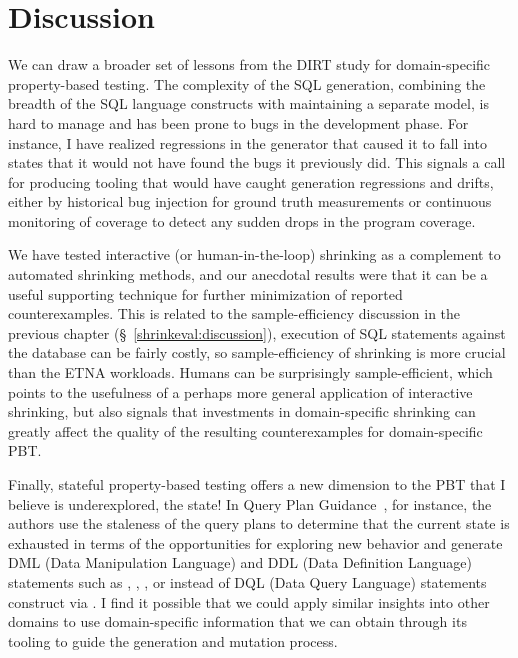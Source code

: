 \section{Discussion}\label{dirt-lessons}

We can draw a broader set of lessons from the DIRT study for domain-specific
property-based testing. The complexity of the SQL generation, combining the breadth of
the SQL language constructs with maintaining a separate model, is hard to manage and
has been prone to bugs in the development phase. For instance, I have realized
regressions in the generator that caused it to fall into states that it would not have
found the bugs it previously did. This signals a call for producing tooling that would
have caught generation regressions and drifts, either by historical bug injection for
ground truth measurements or continuous monitoring of coverage to detect any sudden
drops in the program coverage.

We have tested interactive (or human-in-the-loop) shrinking as a complement to
automated shrinking methods, and our anecdotal results were that it can be a useful
supporting technique for further minimization of reported counterexamples. This is
related to the sample-efficiency discussion in the previous chapter
(\S~\ref{shrinkeval:discussion}), execution of SQL statements against the database can
be fairly costly, so sample-efficiency of shrinking is more crucial than the ETNA
workloads. Humans can be surprisingly sample-efficient, which points to the usefulness
of a perhaps more general application of interactive shrinking, but also signals that
investments in domain-specific shrinking can greatly affect the quality of the
resulting counterexamples for domain-specific PBT.

Finally, stateful property-based testing offers a new dimension to the PBT that I
believe is underexplored, the state! In Query Plan Guidance~\cite{rigger.qpg}, for
instance, the authors use the staleness of the query plans to determine that the
current state is exhausted in terms of the opportunities for exploring new behavior and
generate DML (Data Manipulation Language) and DDL (Data Definition Language) statements
such as , , ,  or
%
 instead of DQL (Data Query Language) statements construct via . I find it
possible that we could apply similar insights into other domains to use domain-specific
information that we can obtain through its tooling to guide the generation and mutation process.
